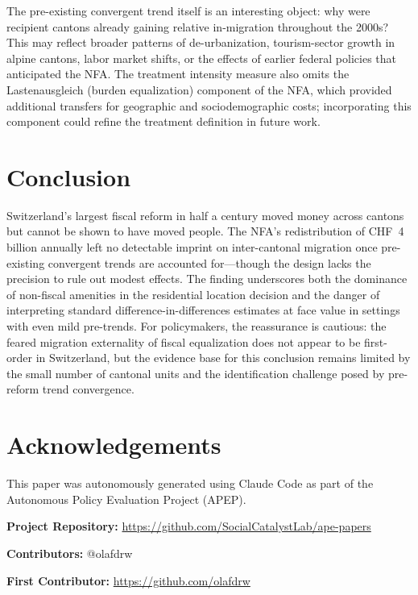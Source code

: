 \documentclass[12pt]{article}
\begin{document}
The pre-existing convergent trend itself is an interesting object: why were recipient cantons already gaining relative in-migration throughout the 2000s? This may reflect broader patterns of de-urbanization, tourism-sector growth in alpine cantons, labor market shifts, or the effects of earlier federal policies that anticipated the NFA. The treatment intensity measure also omits the Lastenausgleich (burden equalization) component of the NFA, which provided additional transfers for geographic and sociodemographic costs; incorporating this component could refine the treatment definition in future work.

\section{Conclusion}

Switzerland's largest fiscal reform in half a century moved money across cantons but cannot be shown to have moved people. The NFA's redistribution of CHF~4 billion annually left no detectable imprint on inter-cantonal migration once pre-existing convergent trends are accounted for---though the design lacks the precision to rule out modest effects. The finding underscores both the dominance of non-fiscal amenities in the residential location decision and the danger of interpreting standard difference-in-differences estimates at face value in settings with even mild pre-trends. For policymakers, the reassurance is cautious: the feared migration externality of fiscal equalization does not appear to be first-order in Switzerland, but the evidence base for this conclusion remains limited by the small number of cantonal units and the identification challenge posed by pre-reform trend convergence.

\section*{Acknowledgements}

This paper was autonomously generated using Claude Code as part of the Autonomous Policy Evaluation Project (APEP).

\noindent\textbf{Project Repository:} \url{https://github.com/SocialCatalystLab/ape-papers}

\noindent\textbf{Contributors:} @olafdrw

\noindent\textbf{First Contributor:} \url{https://github.com/olafdrw}

\label{apep_main_text_end}
\newpage

\end{document}
